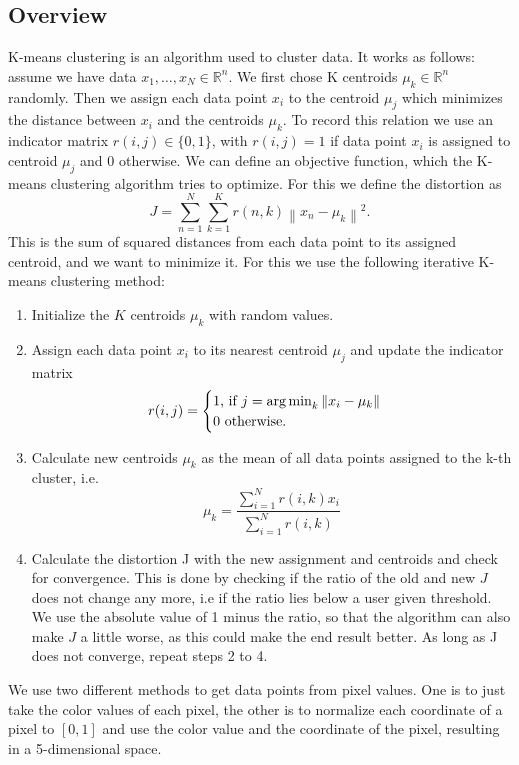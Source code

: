 \subsection{Overview}
K-means clustering is an algorithm used to cluster data. It works as follows: assume we have data $x_1,\ldots,x_N \in \mathbb{R}^n$. We first chose K centroids $\mu_k \in \mathbb{R}^n$ randomly. Then we assign each data point $x_i$ to the centroid $\mu_j$ which minimizes the distance between $x_i$ and the centroids $\mu_k$. To record this relation we use an indicator matrix $r(i,j) \in \{0,1\}$, with $r(i,j)=1$ if data point $x_i$ is assigned to centroid $\mu_j$ and $0$ otherwise. We can define an objective function, which the K-means clustering algorithm tries to optimize. For this we define the distortion as
\begin{equation}
	J = \sum_{n=1}^{N} \sum_{k=1}^{K} r(n,k) \left\|x_n-\mu_k\right\|^2.
\end{equation}
This is the sum of squared distances from each data point to its assigned centroid, and we want to minimize it. For this we use the following iterative K-means clustering method:
\begin{enumerate}
\item Initialize the $K$ centroids $\mu_k$ with random values.
\item Assign each data point $x_i$ to its nearest centroid $\mu_j$ and update the indicator matrix
\[
	r(i,j)= \begin{cases}
               1 \text{, if } j = \operatorname*{arg\,min}_k\left\|x_i-\mu_k\right\| \\

             0 \text{ otherwise.}
            \end{cases}
\]
\item Calculate new centroids $\mu_k$ as the mean of all data points assigned to the k-th cluster, i.e. 
\[
	\mu_k = \frac{\sum\limits_{i=1}^N r(i,k) x_i}{\sum\limits_{i=1}^N r(i,k)}
\]
\item Calculate the distortion J with the new assignment and centroids and check for convergence. This is done by checking if the ratio of the old and new $J$ does not change any more, i.e if the ratio lies below a user given threshold. We use the absolute value of 1 minus the ratio, so that the algorithm can also make $J$ a little worse, as this could make the end result better. As long as J does not converge, repeat steps 2 to 4.
\end{enumerate} 

We use two different methods to get data points from pixel values. One is to just take the color values of each pixel, the other is to normalize each coordinate of a pixel to $[0, 1]$ and use the color value and the coordinate of the pixel, resulting in a 5-dimensional space.

